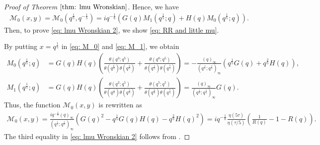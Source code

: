 \documentclass[a4paper]{article}
\numberwithin{equation}{section}
\theoremstyle{plain}
\begin{document}
\begin{proof}[Proof of Theorem $\ref{thm: lmu Wronskian}$]
Hence, we have
\begin{align}
\label{eq: RR and little mu 1}
\mathcal{M}_0(x,y)=\mathcal{M}_0\left(q^\frac{1}{5},q^{-\frac{1}{5}}\right)=iq^{-\frac{1}{8}}\left(G(q)M_1\left(q^\frac{1}{5};q\right)+H(q)M_{0}\left(q^\frac{1}{5};q\right)\right). 
\end{align}
Then, to prove \eqref{eq: lmu Wronskian 2}, we show \eqref{eq: RR and little mu}. 

By putting $x=q^\frac{1}{5}$ in \eqref{eq: M_0} and \eqref{eq: M_1}, we obtain
\begin{align*}
M_0\left(q^\frac{1}{5};q\right)
  &=
  G(q)H(q)\left(\frac{\theta\left(q^3;q^5\right)}{\theta\left(q^\frac{6}{5}\right)\theta\left(q^\frac{2}{5}\right)}+\frac{\theta\left(q^8;q^5\right)}{\theta\left(q^\frac{1}{5}\right)\theta\left(q^\frac{7}{5}\right)}\right)
  =
  -\frac{(q)_\infty}{(q^\frac{1}{5};q^\frac{1}{5})_\infty}\left(q^\frac{1}{5}G(q)+q^\frac{2}{5}H(q)\right), 
  \\
  M_1\left(q^\frac{1}{5};q\right)
  &=
  G(q)H(q)\left(\frac{\theta\left(q^2;q^5\right)}{\theta\left(q^\frac{1}{5}\right)\theta\left(q^\frac{2}{5}\right)}+\frac{\theta\left(q^5;q^5\right)}{\theta\left(q^\frac{6}{5}\right)\theta\left(q^\frac{7}{5}\right)}\right)
  =
  \frac{(q)_\infty}{(q^\frac{1}{5};q^\frac{1}{5})_\infty}G(q). 
\end{align*}
Thus, the function $\mathcal{M}_0(x,y)$ is rewritten as
\begin{align*}
  \mathcal{M}_0(x,y)
  =
  \frac{iq^{-\frac{1}{8}}(q)_\infty}{(q^\frac{1}{5};q^\frac{1}{5})_\infty}\left(G(q)^2-q^\frac{1}{5}G(q)H(q)-q^\frac{2}{5}H(q)^2\right)
  =
  iq^{-\frac{1}{8}}\frac{\eta(5\tau)}{\eta(\tau/5)}\left(\frac{1}{R(q)}-1-R(q)\right).
\end{align*}
The third equality in \eqref{eq: lmu Wronskian 2} follows from \cite[p.48]{W}. 



\end{proof}
\end{document}
